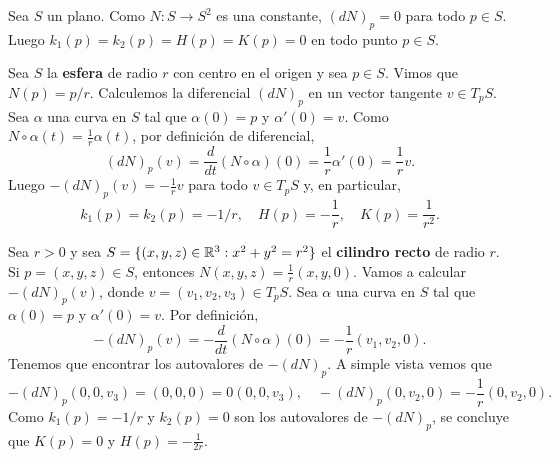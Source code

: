 \begin{example}
	Sea $S$ un plano. Como $N\colon S\to S^2$ es una constante, $(dN)_p=0$ para
	todo $p\in S$. Luego 
	$k_1(p)=k_2(p)=H(p)=K(p)=0$ en todo punto $p\in S$.
\end{example}

\begin{example}
	Sea $S$ la \textbf{esfera} de radio $r$ con centro en el origen y sea $p\in S$. Vimos que 
	$N(p)=p/r$. Calculemos la diferencial $(dN)_p$ en un vector tangente $v\in
	T_pS$. Sea $\alpha$ una curva en $S$ tal que $\alpha(0)=p$ y
	$\alpha'(0)=v$. Como $N\circ\alpha(t)=\frac1r\alpha(t)$, por definición de diferencial, 
	\[
		(dN)_p(v)=\frac{d}{dt}(N\circ\alpha)(0)=\frac1r\alpha'(0)=\frac1rv.
	\]
	Luego $-(dN)_p(v)=-\frac{1}{r}v$ para todo $v\in T_pS$ y, en particular, 
	\[
		k_1(p)=k_2(p)=-1/r,\quad
		H(p)=-\frac{1}{r},\quad
		K(p)=\frac{1}{r^2}.
	\]
\end{example}



\begin{example}
	\label{exa:cilindro_recto:K}
	Sea $r>0$ y sea $S=\{(x,y,z)\in\mathbb{R}^3:x^2+y^2=r^2\}$ el \textbf{cilindro recto} de
	radio $r$. Si $p=(x,y,z)\in S$, entonces $N(x,y,z)=\frac1r(x,y,0)$. Vamos
	a calcular $-(dN)_p(v)$, donde $v=(v_1,v_2,v_3)\in T_pS$. Sea $\alpha$ una
	curva en $S$ tal que $\alpha(0)=p$ y $\alpha'(0)=v$. Por definición,  
	\[
		-(dN)_p(v)=-\frac{d}{dt}(N\circ\alpha)(0)=-\frac1r(v_1,v_2,0).
	\]
	Tenemos que encontrar los autovalores de $-(dN)_p$. A simple vista vemos que 
	\[
		-(dN)_p(0,0,v_3)=(0,0,0)=0(0,0,v_3),\quad
		-(dN)_p(0,v_2,0)=-\frac1r(0,v_2,0).
	\]
	Como $k_1(p)=-1/r$ y $k_2(p)=0$ son los autovalores de $-(dN)_p$, se
	concluye que $K(p)=0$ y $H(p)=-\frac{1}{2r}$.
\end{example}

